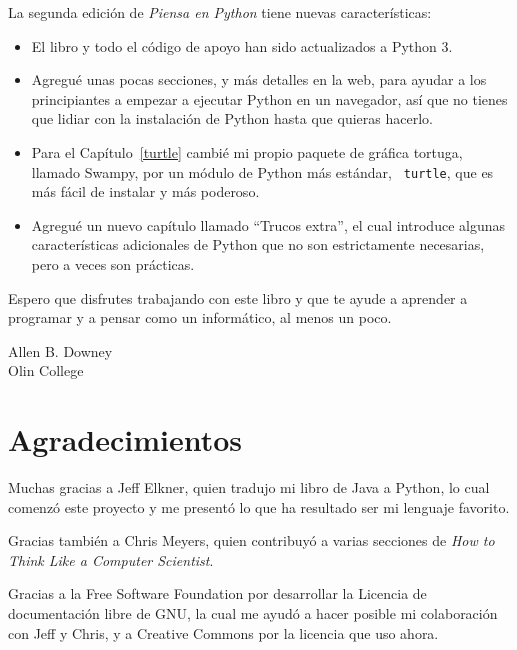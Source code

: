 \documentclass[10pt]{book}
\begin{document}
La segunda edición de {\em Piensa en Python} tiene nuevas características:

\begin{itemize}

\item El libro y todo el código de apoyo han sido actualizados a Python 3.

\item Agregué unas pocas secciones, y más detalles en la web, para ayudar a
los principiantes a empezar a ejecutar Python en un navegador, así que no
tienes que lidiar con la instalación de Python hasta que quieras hacerlo.

\item Para el Capítulo~\ref{turtle} cambié mi propio paquete de gráfica
  tortuga, llamado Swampy, por un módulo de Python más estándar, {\tt
    turtle}, que es más fácil de instalar y más poderoso.

\item Agregué un nuevo capítulo llamado ``Trucos extra'', el cual introduce
algunas características adicionales de Python que no son estrictamente
necesarias, pero a veces son prácticas.

\end{itemize}

Espero que disfrutes trabajando con este libro y que te ayude a aprender
a programar y a pensar como un informático, al menos un poco.


Allen B. Downey \\

Olin College \\


\section*{Agradecimientos}

Muchas gracias a Jeff Elkner, quien
tradujo mi libro de Java a Python, lo cual comenzó este
proyecto y me presentó lo que ha resultado ser mi
lenguaje favorito.

Gracias también a Chris Meyers, quien contribuyó a varias secciones
de {\em How to Think Like a Computer Scientist}.

Gracias a la Free Software Foundation por desarrollar
la Licencia de documentación libre de GNU, la cual me ayudó
a hacer posible mi colaboración con Jeff y Chris, y a Creative
Commons por la licencia que uso ahora.
\end{document}
